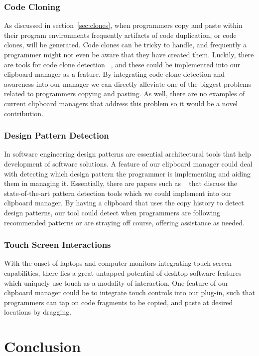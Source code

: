 \documentclass{acm_proc_article-sp}
\begin{document}
\subsubsection{Code Cloning}
As discussed in section~\ref{sec:clones}, when programmers copy and paste within their program environments frequently artifacts of code duplication, or code clones, will be generated. Code clones can be tricky to handle, and frequently a programmer might not even be aware that they have created them. Luckily, there are tools for code clone detection ~\cite{CloneTag}, and these could be implemented into our clipboard manager as a feature. By integrating code clone detection and awareness into our manager we can directly alleviate one of the biggest problems related to programmers copying and pasting. As well, there are no examples of current clipboard managers that address this problem so it would be a novel contribution.

\subsubsection{Design Pattern Detection}
In software engineering design patterns are essential architectural tools that help development of software solutions. A feature of our clipboard manager could deal with detecting which design pattern the programmer is implementing and aiding them in managing it. Essentially, there are papers such as ~\cite{Pattern} that discuss the state-of-the-art pattern detection tools which we could implement into our clipboard manager. By having a clipboard that uses the copy history to detect design patterns, our tool could detect when programmers are following recommended patterns or are straying off course, offering assistance as needed.

\subsubsection{Touch Screen Interactions}
With the onset of laptops and computer monitors integrating touch screen capabilities, there lies a great untapped potential of desktop software features which uniquely use touch as a modality of interaction. One feature of our clipboard manager could be to integrate touch controls into our plug-in, such that programmers can tap on code fragments to be copied, and paste at desired locations by dragging.

\section{Conclusion}\label{sec:conclusion}
\end{document}
